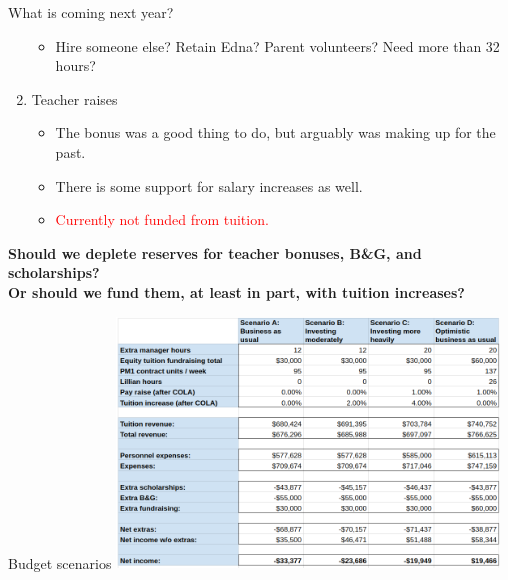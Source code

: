 \documentclass[8pt]{beamer}
\begin{document}
\begin{frame}{What is coming next year?}
\begin{enumerate}
\begin{itemize}
        \item Hire someone else?  Retain Edna?  Parent volunteers?  Need more than 32 hours?
    \end{itemize}
%
\pause
\item Teacher raises
    \begin{itemize}
        \item The bonus was a good thing to do, but arguably was making up for the past.
        \item There is some support for salary increases as well.
        \item \textcolor{red}{Currently not funded from tuition.}
    \end{itemize}
\end{enumerate}
%
\pause
\textbf{Should we deplete reserves for teacher bonuses, B\&G, and scholarships?}\\
\textbf{Or should we fund them, at least in part, with tuition increases?}

\end{frame}


\begin{frame}{Budget scenarios}
\includegraphics[width=4in]{budget_scenarios.png}
\end{frame}

%
%
\end{document}
